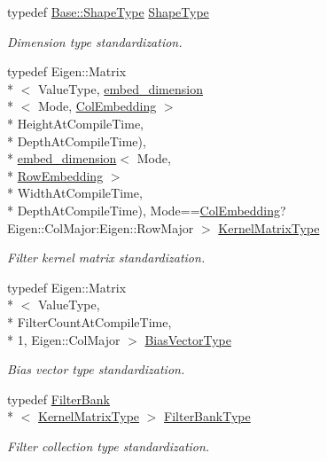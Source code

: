 \begin{DoxyCompactItemize}
typedef \hyperlink{classffnn_1_1layer_1_1internal_1_1_interface_a945709b1d0ea54a51539b80d04485f5f}{Base\-::\-Shape\-Type} \hyperlink{classffnn_1_1layer_1_1_convolution_volume_ae31080a107422dcfaff38eafadd69494}{Shape\-Type}
\begin{DoxyCompactList}\small\item\em Dimension type standardization. \end{DoxyCompactList}\item 
typedef Eigen\-::\-Matrix\\*
$<$ Value\-Type, \hyperlink{namespaceffnn_1_1layer_ad128f693900faa5bcf2cdd0ef8e7eee6}{embed\-\_\-dimension}\\*
$<$ Mode, \hyperlink{namespaceffnn_1_1layer_a254f16beba4fb335d935e9b43bb9e69aa42ac01b35d45fd60256ef5008c96c049}{Col\-Embedding} $>$\\*
Height\-At\-Compile\-Time, \\*
Depth\-At\-Compile\-Time), \\*
\hyperlink{namespaceffnn_1_1layer_ad128f693900faa5bcf2cdd0ef8e7eee6}{embed\-\_\-dimension}$<$ Mode, \\*
\hyperlink{namespaceffnn_1_1layer_a254f16beba4fb335d935e9b43bb9e69aa91eb0d1f175a08e2b2991cae348c827d}{Row\-Embedding} $>$\\*
Width\-At\-Compile\-Time, \\*
Depth\-At\-Compile\-Time), Mode==\hyperlink{namespaceffnn_1_1layer_a254f16beba4fb335d935e9b43bb9e69aa42ac01b35d45fd60256ef5008c96c049}{Col\-Embedding}?Eigen\-::\-Col\-Major\-:\-Eigen\-::\-Row\-Major $>$ \hyperlink{classffnn_1_1layer_1_1_convolution_volume_ad928a402aa7aa7e5fb3cd5b7f088f73e}{Kernel\-Matrix\-Type}
\begin{DoxyCompactList}\small\item\em Filter kernel matrix standardization. \end{DoxyCompactList}\item 
typedef Eigen\-::\-Matrix\\*
$<$ Value\-Type, \\*
Filter\-Count\-At\-Compile\-Time, \\*
1, Eigen\-::\-Col\-Major $>$ \hyperlink{classffnn_1_1layer_1_1_convolution_volume_ac2655aee05415e5ffc76cf7b0ba64e61}{Bias\-Vector\-Type}
\begin{DoxyCompactList}\small\item\em Bias vector type standardization. \end{DoxyCompactList}\item 
typedef \hyperlink{classffnn_1_1layer_1_1_filter_bank}{Filter\-Bank}\\*
$<$ \hyperlink{classffnn_1_1layer_1_1_convolution_volume_ad928a402aa7aa7e5fb3cd5b7f088f73e}{Kernel\-Matrix\-Type} $>$ \hyperlink{classffnn_1_1layer_1_1_convolution_volume_a73cb805b7ffa2bc96461412e1cf958f9}{Filter\-Bank\-Type}
\begin{DoxyCompactList}\small\item\em Filter collection type standardization. \end{DoxyCompactList}\end{DoxyCompactItemize}
